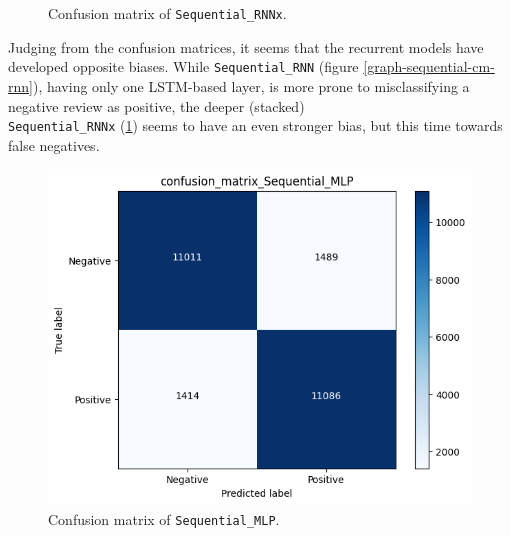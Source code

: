 \begin{figure}[!h]
\begin{minipage}{0.48\textwidth}
        \caption{Confusion matrix of \texttt{Sequential\_RNNx}.}
        \label{graph-sequential-cm-rnnx}
    \end{minipage}
\end{figure}
Judging from the confusion matrices, it seems that the recurrent models have developed opposite biases.
While \texttt{Sequential\_RNN} (figure \ref{graph-sequential-cm-rnn}), having only one LSTM-based layer,
is more prone to misclassifying a negative review as positive, the deeper (stacked)\\ \texttt{Sequential\_RNNx}
(\ref{graph-sequential-cm-rnnx}) seems to have an even stronger bias, but this time towards false negatives.


\begin{figure}[!h]
    \centering
    \begin{minipage}{0.48\textwidth}
        \centering
        \captionsetup{justification=centering}
        \includegraphics[width=\linewidth]{obrazky-figures/Sequential_experiment/confusion_matrix_Sequential_MLP_2023-04-07_16:57:13.png}
        \caption{Confusion matrix of \texttt{Sequential\_MLP}.}
        \label{graph-sequential-cm-mlp}
    \end{minipage}\hfill
    \begin{minipage}{0.48\textwidth}
        \centering
        \captionsetup{justification=centering}

\end{minipage}
\end{figure}
